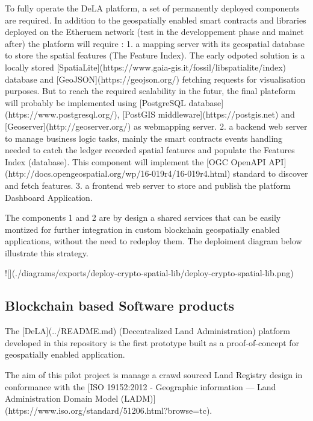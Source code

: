 \documentclass{isprs} %
\begin{document}
To fully operate the DeLA platform, a set of permanently deployed components are required. In addition to the geospatially enabled smart contracts and libraries deployed on the Etheruem network (test in the developpement phase and mainet after) the platform will require : 
1. a mapping server with its geospatial database to store the spatial features (The Feature Index). The early odpoted solution is a locally stored [SpatiaLite](https://www.gaia-gis.it/fossil/libspatialite/index) database and [GeoJSON](https://geojson.org/) fetching requests for visualisation purposes. But to reach the required scalability in the futur, the final plateform will probably be implemented using [PostgreSQL database](https://www.postgresql.org/), [PostGIS middleware](https://postgis.net) and [Geoserver](http://geoserver.org/) as webmapping server.  
2. a backend web server to manage business logic tasks, mainly the smart contracts events handling needed to catch the ledger recorded spatial features and populate the Features Index (database). This component will implement the [OGC OpenAPI API](http://docs.opengeospatial.org/wp/16-019r4/16-019r4.html) standard to discover and fetch features.
3. a frontend web server to store and publish the platform Dashboard Application. 

The components 1 and 2 are by design a shared services that can be easily montized for further integration in custom blockchain geospatially enabled applications, without the need to redeploy them. The deploiment diagram below illustrate this strategy.

![](./diagrams/exports/deploy-crypto-spatial-lib/deploy-crypto-spatial-lib.png)


\subsection{Blockchain based Software products}\label{sec:Blockchain based Software products}

The [DeLA](../README.md) (Decentralized Land Administration) platform developed in this repository is the first prototype built as a proof-of-concept for geospatially enabled application.

The aim of this pilot project is manage a crawd sourced Land Registry design in conformance with the [ISO 19152:2012 - Geographic information — Land Administration Domain Model (LADM)](https://www.iso.org/standard/51206.html?browse=tc).
\end{document}
